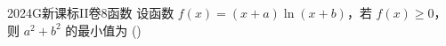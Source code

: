 
\begin{problem}{2024}{G}{新课标II卷}{8}{函数}
设函数 $ f(x)=(x+a)\ln(x+b) $，若 $ f(x)\geq 0 $，则 $ a^2+b^2 $ 的最小值为 (\hspace{1cm})
\begin{choices}
\end{choices}
\end{problem}